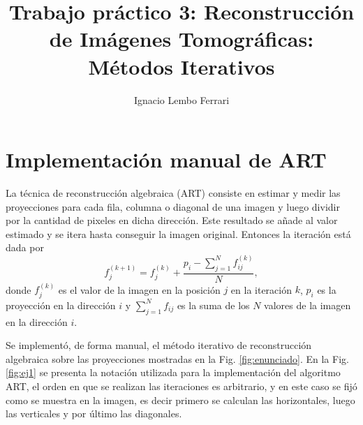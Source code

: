 \documentclass[letterpaper,12pt]{article}
\title{Trabajo práctico 3: Reconstrucción de Imágenes Tomográficas: Métodos Iterativos} %
\author[1]{Ignacio Lembo Ferrari}
\affil[1]{Instituto Balseiro}
\date{\vspace{-4ex}}
\theoremstyle{plain}
\begin{document}
\maketitle

\section{Implementación manual de ART}

La técnica de reconstrucción algebraica (ART) consiste en estimar y medir las proyecciones para cada fila, columna o diagonal de una imagen y luego dividir por la cantidad de pixeles en dicha dirección. Este resultado se añade al valor estimado y se itera hasta conseguir la imagen original. Entonces la iteración está dada por  
\begin{equation}
   f_j^{(k+1)} = f_j^{(k)} + \frac{p_i - \sum_{j=1}^{N} f_{ij}^{(k)}  } {N},
\end{equation}
donde $f_j^{(k)}$ es el valor de la imagen en la posición $j$ en la iteración $k$, $p_i$ es la proyección en la dirección $i$ y $\sum_{j=1}^N f_{ij}$ es la suma de los $N$ valores de la imagen en la dirección $i$. 

Se implementó, de forma manual, el método iterativo de reconstrucción algebraica sobre las proyecciones mostradas en la Fig. \ref{fig:enunciado}. En la Fig. \ref{fig:ej1} se presenta la notación utilizada para la implementación del algoritmo ART, el orden en que se realizan las iteraciones es arbitrario, y en este caso se fijó como se muestra en la imagen, es decir primero se calculan las horizontales, luego las verticales y por último las diagonales.
\end{document}

